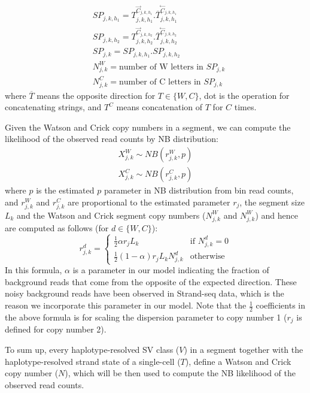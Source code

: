 \documentclass[12pt]{article}
\renewcommand{\j}{j} %
\newcommand{\CN}{C} %
\newcommand{\X}{X} %
\renewcommand{\k}{k} %
\newcommand{\h}{h} %
\newcommand{\T}{T} %
\newcommand{\V}{V} %
\newcommand{\N}{N} %
\begin{document}
\begin{align}\label{strand-pattern}
	&SP_{\j,\k,\h_1} = {\T^{\stackrel{\rightarrow}\CN_{\j,\k,\h_1}}_{\j, \k, \h_1}}.
				  {\overline{\T}^{\stackrel{\leftarrow}\CN_{\j,\k,\h_1}}_{\j, \k,\h_1}}\\
	&SP_{\j,\k,\h_2} = \T^{\stackrel{\rightarrow}\CN_{\j,\k,\h_2}}_{\j, \k, \h_2}.
				  {\overline{\T}^{\stackrel{\leftarrow}\CN_{\j,\k,\h_2}}_{\j, \k,\h_2}}\nonumber\\
	&SP_{\j,\k} = SP_{\j, \k, \h_1}.SP_{\j, \k, \h_2}\nonumber\\
	&\N_{\j, \k}^W = \text{number of W letters in } SP_{\j,\k}\nonumber\\
	&\N_{\j, \k}^C = \text{number of C letters in } SP_{\j,\k}\nonumber
\end{align}
where $\overline{\T}$ means the opposite direction for $\T \in \{W, C\}$, dot is the operation for concatenating strings, and $\T^C$ means concatenation of $\T$ for $C$ times.

Given the Watson and Crick copy numbers in a segment, we can compute the likelihood of the observed read counts by NB distribution:
\begin{align}
	\X_{\j,\k}^W \sim NB(r_{\j,\k}^W, p)\nonumber\\
	\X_{\j,\k}^C \sim NB(r_{\j,\k}^C, p)\nonumber
\end{align}
where $p$ is the estimated $p$ parameter in NB distribution from bin read counts, and $r_{\j,\k}^W$ and $r_{\j,\k}^C$ are proportional to the estimated parameter $r_\j$, the segment size $L_\k$ and the Watson and Crick segment copy numbers ($\N_{\j, \k}^W$ and $\N_{\j, \k}^W$) and hence are computed as follows (for $d \in \{W,C\}$):
\[
r_{\j,\k}^d = 
\begin{cases}
\frac{1}{2}\alpha r_\j L_\k &\text{if } \N_{\j, \k}^d = 0 \\ 
\frac{1}{2}(1- \alpha) r_\j L_\k \N_{\j, \k}^d &\text{otherwise}
\end{cases}
\]
In this formula, $\alpha$ is a parameter in our model indicating the fraction of background reads that come from the opposite of the expected direction. These noisy background reads have been observed in Strand-seq data, which is the reason we incorporate this parameter in our model. Note that the $\frac{1}{2}$ coefficients in the above formula is for scaling the dispersion parameter to copy number 1 ($r_\j$ is defined for copy number 2).

To sum up, every haplotype-resolved SV class ($\V$) in a segment together with the haplotype-resolved strand state of a single-cell ($\T$), define a Watson and Crick copy number ($\N$), which will be then used to compute the NB likelihood of the observed read counts.
\end{document}
